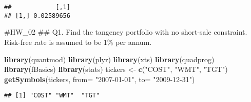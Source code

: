\documentclass[]{article}
\newenvironment{Shaded}{\begin{snugshade}}{\end{snugshade}}
\newcommand{\ControlFlowTok}[1]{\textcolor[rgb]{0.13,0.29,0.53}{\textbf{#1}}}
\newcommand{\DataTypeTok}[1]{\textcolor[rgb]{0.13,0.29,0.53}{#1}}
\newcommand{\DecValTok}[1]{\textcolor[rgb]{0.00,0.00,0.81}{#1}}
\newcommand{\KeywordTok}[1]{\textcolor[rgb]{0.13,0.29,0.53}{\textbf{#1}}}
\newcommand{\NormalTok}[1]{#1}
\newcommand{\OperatorTok}[1]{\textcolor[rgb]{0.81,0.36,0.00}{\textbf{#1}}}
\newcommand{\StringTok}[1]{\textcolor[rgb]{0.31,0.60,0.02}{#1}}
\begin{document}
\begin{verbatim}
##            [,1]
## [1,] 0.02589656
\end{verbatim}

\#HW\_02 \#\# Q1. Find the tangency portfolio with no short-sale
constraint. Risk-free rate is assumed to be 1\% per annum.

\begin{Shaded}
\begin{Highlighting}[]
\KeywordTok{library}\NormalTok{(quantmod)}
\KeywordTok{library}\NormalTok{(plyr)}
\KeywordTok{library}\NormalTok{(xts)}
\KeywordTok{library}\NormalTok{(quadprog)}
\KeywordTok{library}\NormalTok{(fBasics)}
\KeywordTok{library}\NormalTok{(stats)}
\NormalTok{tickers <-}\StringTok{ }\KeywordTok{c}\NormalTok{(}\StringTok{"COST"}\NormalTok{, }\StringTok{"WMT"}\NormalTok{, }\StringTok{"TGT"}\NormalTok{)}
\KeywordTok{getSymbols}\NormalTok{(tickers, }\DataTypeTok{from=} \StringTok{"2007-01-01"}\NormalTok{, }\DataTypeTok{to=} \StringTok{"2009-12-31"}\NormalTok{)}
\end{Highlighting}
\end{Shaded}

\begin{verbatim}
## [1] "COST" "WMT"  "TGT"
\end{verbatim}

\begin{Shaded}
\end{Shaded}
\end{document}

